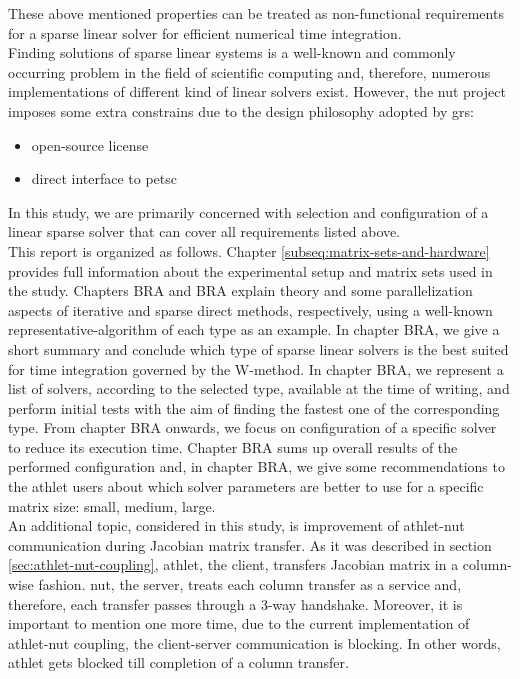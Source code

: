 These above mentioned properties can be treated as non-functional requirements for a sparse linear solver for efficient numerical time integration.\\

 
Finding solutions of sparse linear systems is a well-known and commonly occurring problem in the field of scientific computing and, therefore, numerous implementations of different kind of linear solvers exist. However, the \gls{nut} project imposes some extra constrains due to the design philosophy adopted by \gls{grs}: \\


\begin{itemize}
	\item open-source license
	\item direct interface to \gls{petsc}
\end{itemize}



In this study, we are primarily concerned with selection and configuration of a linear sparse solver that can cover all requirements listed above.\\


This report is organized as follows. Chapter \ref{subseq:matrix-sets-and-hardware} provides full information about the experimental setup and matrix sets used in the study. Chapters BRA and BRA explain theory and some parallelization aspects of iterative and sparse direct methods, respectively, using a  well-known representative-algorithm of each type as an example. In chapter BRA, we give a short summary and conclude which type of sparse linear solvers is the best suited for time integration governed by the W-method. In chapter BRA, we represent a list of solvers, according to the selected type, available at the time of writing, and perform initial tests with the aim of finding the fastest one of the corresponding type. From chapter BRA onwards, we focus on configuration of a specific solver to reduce its execution time. Chapter BRA sums up overall results of the performed configuration and, in chapter BRA, we give some recommendations to the \gls{athlet} users about which solver parameters are better to use for a specific matrix size: small, medium, large.\\


An additional topic, considered in this study, is improvement of \gls{athlet}-\gls{nut} communication during Jacobian matrix transfer. As it was described in section \ref{sec:athlet-nut-coupling}, \gls{athlet}, the client, transfers Jacobian matrix in a column-wise fashion. \gls{nut}, the server, treats each column transfer as a service and, therefore, each transfer passes through a 3-way handshake. Moreover, it is important to mention one more time,   due to the current implementation of \gls{athlet}-\gls{nut} coupling, the client-server communication is blocking. In other words, \gls{athlet} gets blocked till completion of a column transfer. \\


